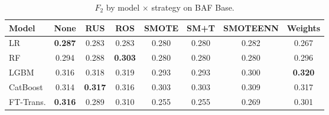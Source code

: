 \begin{table}[ht!]
\centering
\caption{$F_2$ by model $\times$ strategy on BAF Base.}
\label{tab:factorial_baf_f2}
\begin{tabular}{l c c c c c c c}
\toprule
Model & None & RUS & ROS & SMOTE & SM+T & SMOTEENN & Weights \\
\midrule
LR         & \textbf{0.287} & 0.283 & 0.283 & 0.280 & 0.280 & 0.282 & 0.267 \\
RF         & 0.294 & 0.288 & \textbf{0.303} & 0.280 & 0.280 & 0.280 & 0.296 \\
LGBM       & 0.316 & 0.318 & 0.319 & 0.293 & 0.293 & 0.300 & \textbf{0.320} \\
CatBoost   & 0.314 & \textbf{0.317} & 0.316 & 0.303 & 0.303 & 0.309 & 0.317 \\
FT-Trans.  & \textbf{0.316} & 0.289 & 0.310 & 0.255 & 0.255 & 0.269 & 0.301 \\
\bottomrule
\end{tabular}
\end{table}